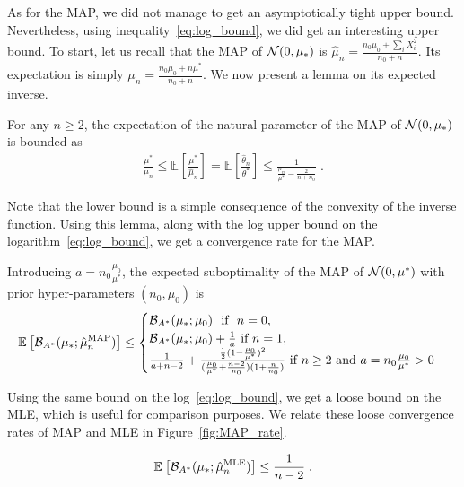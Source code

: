 \documentclass{article}
\newcommand*{\expect}[2][]{\ensuremath{\mathbb{E}_{#1} \left[ #2 \right] }} %
\newcommand{\logpart}{A}
\newcommand{\bregmanconj}{\cB_{\logpart^*}}
\newcommand{\natp}{\theta}
\newcommand{\MAPm}{\hat \mu_n}
\newcommand{\MAPt}{\hat \natp_n}
\begin{document}
As for the MAP, we did not manage to get an asymptotically tight upper bound. Nevertheless, using inequality~\eqref{eq:log_bound}, we did get an interesting upper bound. 
To start, let us recall that the MAP of ${\mathcal N}(0,\mu_*)$ is $\hat \mu_n = \frac{n_0 \mu_0 + \sum_i X_i^2}{n_0 + n}$.
Its expectation is simply $\mu_n= \frac{n_0 \mu_0 + n \mu^*}{n_0 + n}$.
We now present a lemma on its expected inverse.
\begin{example}
\begin{lemma}
	For any $n\geq 2$, the expectation of the natural parameter of the MAP of ${\mathcal N}(0,\mu_*)$ is bounded as
	\begin{align}
		\frac{\mu^*}{\mu_n}
		\leq \expect{\frac{\mu^*}{\MAPm}} 
		= \expect{\frac{\MAPt}{\natp^*}} 
		\leq \frac{1}{\frac{\mu_n}{\mu^*} - \frac{2}{n+n_0}} \; .
	\label{eq:theta_expectation_bound}
	\end{align}
\end{lemma}
\end{example}
Note that the lower bound is a simple consequence of the convexity of the inverse function. 
Using this lemma, along with the log upper bound on the logarithm~\eqref{eq:log_bound}, we get a convergence rate for the MAP. 
\begin{example}
\begin{theorem}
 Introducing $a=n_0 \frac{\mu_0}{\mu^*}$, the expected suboptimality of the MAP of ${\mathcal N}(0,\mu^*)$ with prior hyper-parameters $(n_0,\mu_0)$ is 
\begin{equation}
	\expect{\bregmanconj( \mu_*; \hat \mu_n^\text{MAP})}
	\leq \begin{cases}
		\bregmanconj( \mu_*; \mu_0) \ \text{ if } \ n=0, \\
		\bregmanconj( \mu_*; \mu_0) + \inv{a} \ \text{if}\ n=1,\\
		\frac{1}{a+n-2} + \frac{\half(1 - \frac{\mu_0}{\mu^*})^2}{(\frac{\mu_0}{\mu^*}+\frac{n-2}{n_0})(1 + \frac{n}{n_0} )} \ \text{if}\  n\geq 2 \ \text{and}\ a=n_0 \frac{\mu_0}{\mu^*} >0
	\end{cases}
	\label{eq:MAP_rate}
\end{equation}
\end{theorem}
\end{example}
Using the same bound on the log~\eqref{eq:log_bound}, we  get a loose bound on the MLE, which is useful for comparison purposes.
We relate these loose convergence rates of MAP and MLE in Figure~\ref{fig:MAP_rate}.
\begin{example}
\begin{corollary}
\begin{equation}
	\expect{\bregmanconj( \mu_*; \hat \mu_n^\text{MLE}) }
	\leq \inv{n-2} \; .
	\label{eq:MLE_loose_rate}
\end{equation}
\end{corollary}
\end{example}
\end{document}
